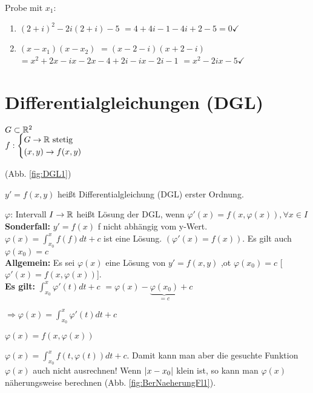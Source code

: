 Probe mit $x_1$:
\begin{enumerate}
\item $(2+i)^2 - 2i(2+i) - 5 $
$=4+4i-1-4i+2-5=0 \checkmark$
\item $(x-x_1)(x-x_2)$
$=(x-2-i)(x+2-i)$
$=x^2 + 2x - ix -2x -4 +2i -ix -2i -1$
$=x^2 -2ix -5 \checkmark$
\end{enumerate}

\section{Differentialgleichungen (DGL)}
\begin{defi}
$G \subset \mathbb{R}^2$\\
$f:
\begin{cases}
G \rightarrow \mathbb{R} \textrm{ stetig} \\
(x,y) \rightarrow f(x,y)
\end{cases}$
\end{defi} 
(Abb. \ref{fig:DGL1})

$y' = f(x,y)$ heißt Differentialgleichung (DGL) erster Ordnung. 

$\varphi$: Intervall $I \rightarrow \mathbb{R}$ heißt Lösung der DGL, wenn 
$\varphi'(x) = f(x,\varphi(x)), \forall x\in I$ \\

\textbf{Sonderfall:} $y' = f(x) $ f nicht abhängig vom y-Wert. \\
$\varphi(x) = \int_{x_0}^{x} f(f) dt + c$ ist eine Lösung. 
$(\varphi'(x) = f(x))$. Es gilt auch \underline{$\varphi(x_0)=c$}\\

\textbf{Allgemein:} Es sei $\varphi(x)$ eine Lösung von $y' = f(x,y)$ ,ot $\varphi(x_0)=c$ [$\varphi'(x)=f(x,\varphi(x))$].\\

\textbf{Es gilt:} 
$\int_{x_0}^{x} \varphi'(t) dt + c$
$=\varphi(x) - \underbrace{\varphi(x_0)}_{=c} + c $

$\Rightarrow \varphi(x) = \int_{x_0}^{x} \varphi'(t) dt + c$ 

$\varphi(x) = f(x,\varphi(x))$

$\varphi(x) = \int_{x_0}^{x} f(t, \varphi(t)) dt + c$. Damit kann man aber die gesuchte Funktion $\varphi(x)$ auch nicht ausrechnen! Wenn $ \left\vert x-x_0 \right\vert $ klein ist, so kann man $\varphi(x)$ näherungsweise berechnen (Abb. \ref{fig:BerNaeherungFl1}). 

